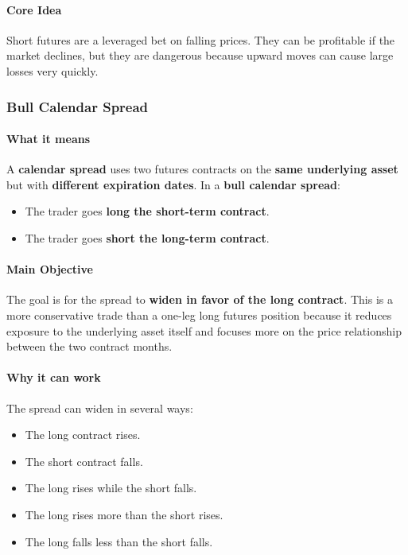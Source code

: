 \documentclass[12pt,openany]{book}
\begin{document}
\paragraph{Core Idea}

Short futures are a leveraged bet on falling prices. They can be profitable if the market declines, but they are dangerous because upward moves can cause large losses very quickly.

\subsubsection{Bull Calendar Spread}

\paragraph{What it means}

A \textbf{calendar spread} uses two futures contracts on the \textbf{same underlying asset} but with \textbf{different expiration dates}. In a \textbf{bull calendar spread}:

\begin{itemize}[leftmargin=*]
    \item The trader goes \textbf{long the short-term contract}.
    \item The trader goes \textbf{short the long-term contract}.
\end{itemize}

\paragraph{Main Objective}

The goal is for the spread to \textbf{widen in favor of the long contract}. This is a more conservative trade than a one-leg long futures position because it reduces exposure to the underlying asset itself and focuses more on the price relationship between the two contract months.

\paragraph{Why it can work}

The spread can widen in several ways:

\begin{itemize}[leftmargin=*]
    \item The long contract rises.
    \item The short contract falls.
    \item The long rises while the short falls.
    \item The long rises more than the short rises.
    \item The long falls less than the short falls.
\end{itemize}
\end{document}
